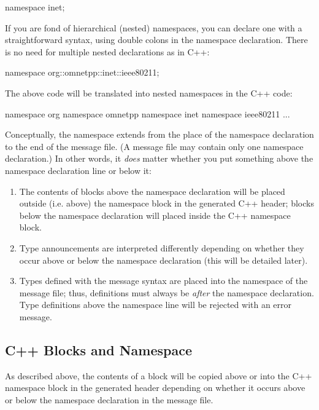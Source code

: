 \begin{msg}
namespace inet;
\end{msg}

If you are fond of hierarchical (nested) namespaces, you can declare one
with a straightforward syntax, using double colons in the namespace
declaration. There is no need for multiple nested 
declarations as in C++:

\begin{msg}
namespace org::omnetpp::inet::ieee80211;
\end{msg}

The above code will be translated into nested namespaces in the C++ code:

\begin{cpp}
namespace org { namespace omnetpp { namespace inet { namespace ieee80211 {
...
}}}}
\end{cpp}

Conceptually, the namespace extends from the place of the namespace
declaration to the end of the message file. (A message file may contain
only one namespace declaration.) In other words, it \textit{does} matter
whether you put something above the namespace declaration line or below it:

\begin{enumerate}
\item The contents of  blocks above the namespace
      declaration will be placed outside (i.e. above) the namespace block
      in the generated C++ header; blocks below the namespace declaration
      will placed inside the C++ namespace block.
\item Type announcements are interpreted differently depending on whether
      they occur above or below the namespace declaration (this will be
      detailed later).
\item Types defined with the message syntax are placed into the namespace
      of the message file; thus, definitions must always be \textit{after}
      the namespace declaration. Type definitions above the namespace line
      will be rejected with an error message.
\end{enumerate}

\subsection{C++ Blocks and Namespace}
\label{sec:msg-def:cpp-blocks-and-namespace}

As described above, the contents of a  block will be
copied above or into the C++ namespace block in the generated header
depending on whether it occurs above or below the namespace declaration in
the message file.

